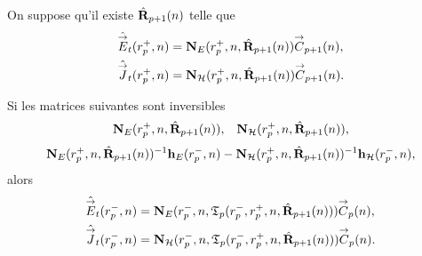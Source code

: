     \begin{prop}%
      \label{prop:sphere:transfert:reflexion}
      On suppose qu'il existe \(\hat{\mathbf{R}}_{p+1}(n)\) telle que 
      \begin{align*}
        \hat{{\overset{\rightarrow}{E}}}_t(r_{p}^+,n) &= \mathbf{N}_{E}(r_p^+,n,\hat{\mathbf{R}}_{p+1}(n)){\overset{\rightarrow}{C}}_{p+1}(n),
        \\
        \hat{{\overset{\rightarrow}{J}}}_t(r_{p}^+,n) &= \mathbf{N}_{\mathcal{H}}(r_p^+,n,\hat{\mathbf{R}}_{p+1}(n)){\overset{\rightarrow}{C}}_{p+1}(n).
      \end{align*}

      Si les matrices suivantes sont inversibles
      \begin{align*}
        \mathbf{N}_{E}(r_p^+,n,\hat{\mathbf{R}}_{p+1}(n)), && \mathbf{N}_{\mathcal{H}}(r_p^+,n,\hat{\mathbf{R}}_{p+1}(n)),
      \end{align*}
      \begin{align*}
        \mathbf{N}_{E}(r_p^+,n,\hat{\mathbf{R}}_{p+1}(n))^{-1}\mathbf{h}_{E}(r_p^-,n) - \mathbf{N}_{\mathcal{H}}(r_p^+,n,\hat{\mathbf{R}}_{p+1}(n))^{-1}\mathbf{h}_{\mathcal{H}}(r_p^-,n),
      \end{align*}
      alors
      \begin{align*}
        \hat{{\overset{\rightarrow}{E}}}_t(r_{p}^-,n) &= \mathbf{N}_{E}(r_p^-,n,\mathfrak{T}_p(r_p^-,r_p^+,n,\hat{\mathbf{R}}_{p+1}(n))){\overset{\rightarrow}{C}}_{p}(n),
        \\
        \hat{{\overset{\rightarrow}{J}}}_t(r_{p}^-,n) &= \mathbf{N}_{\mathcal{H}}(r_p^-,n,\mathfrak{T}_p(r_p^-,r_p^+,n,\hat{\mathbf{R}}_{p+1}(n))){\overset{\rightarrow}{C}}_{p}(n).
      \end{align*}
    \end{prop}

